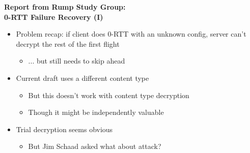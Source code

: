 \documentclass[helvetica]{seminar}
\newcommand{\heading}[1]{%
  \begin{center} 
    \large\bf 
    #1 
  \end{center} 
  \vspace{.4 in}}
\begin{document}
\begin{slide}
\heading{Report from Rump Study Group:\\0-RTT Failure Recovery (I)}

\begin{itemize}
\item Problem recap: if client does 0-RTT with an unknown config, server can't decrypt the rest of the first flight
  \begin{itemize}
  \item ... but still needs to skip ahead
  \end{itemize}

\item Current draft uses a different content type
  \begin{itemize}
  \item But this doesn't work with content type decryption
  \item Though it might be independently valuable
  \end{itemize}

\item Trial decryption seems obvious
  \begin{itemize}
  \item But Jim Schaad asked what about attack?
  \end{itemize}
\end{itemize}
\end{slide}
\end{document}
